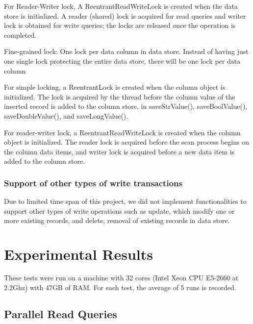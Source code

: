 \documentclass[11pt,journal,compsoc]{IEEEtran}
\begin{document}
For Reader-Writer lock, A ReentrantReadWriteLock is created when the data store is initialized. A reader (shared) lock is acquired for read queries and writer lock is obtained for write queries; the locks are released once the operation is completed.
 
Fine-grained lock: One lock per data column in data store. Instead of having just one single lock protecting the entire data store, there will be one lock per data column
 
For simple locking, a ReentrantLock is created when the column object is initialized. The lock is acquired by the thread before the column value of the inserted record is added to the column store, in saveStrValue(), saveBoolValue(), saveDoubleValue(), and saveLongValue().
 
For reader-writer lock,  a ReentrantReadWriteLock is created when the column object is initialized. The reader lock is acquired before the scan process begins on the column data items, and writer lock is acquired before a new data item is added to the column store.



\subsubsection{Support of other types of write transactions}
Due to limited time span of this project, we did not implement functionalities to support other types of write operations such as update, which modify one or more existing records, and delete, removal of existing records in data store.


\section{Experimental Results}
These tests were run on a machine with 32 cores (Intel Xeon CPU E5-2660 at 2.2Ghz) with 47GB of RAM. For each test, the average of 5 runs is recorded.

\subsection{Parallel Read Queries}
\end{document}
